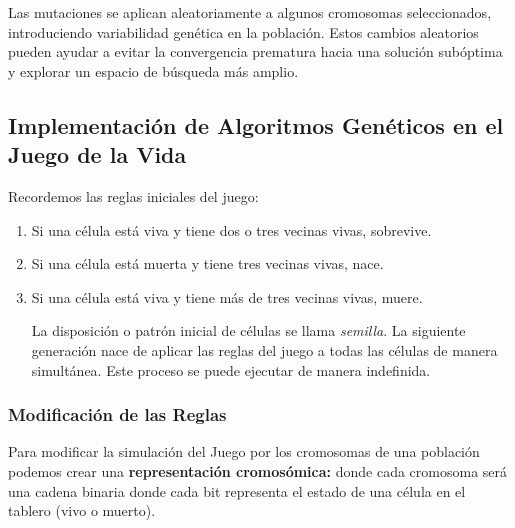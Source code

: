 Las mutaciones se aplican aleatoriamente a algunos cromosomas seleccionados, introduciendo variabilidad genética en la población. Estos cambios aleatorios pueden ayudar a evitar la convergencia prematura hacia una solución subóptima y explorar un espacio de búsqueda más amplio.





\subsection{Implementación de Algoritmos Genéticos en el Juego de la Vida}

Recordemos las reglas iniciales del juego:
\begin{enumerate}
    \item Si una célula está viva y tiene dos o tres vecinas vivas, sobrevive.
    \item Si una célula está muerta y tiene tres vecinas vivas, nace.
    \item Si una célula está viva y tiene más de tres vecinas vivas, muere.
    
    La disposición o patrón inicial de células se llama \textit{semilla}. La siguiente 
    generación nace de aplicar las reglas del juego a todas las células de manera 
    simultánea. Este proceso se puede ejecutar de manera indefinida.
\end{enumerate}

\subsubsection*{Modificación de las Reglas}

Para modificar la simulación del Juego por los cromosomas de una población podemos crear
una \textbf{representación cromosómica:} donde cada cromosoma será una cadena binaria 
donde cada bit representa el estado de una célula en el tablero (vivo o muerto).\\ 

